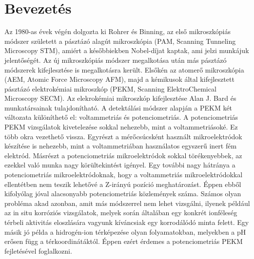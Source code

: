 \chapter{Bevezetés}
\pagestyle{headings}
Az 1980-as évek végén dolgozta ki Rohrer és Binning, az első mikroszkópiás módszer született a pásztázó alagút mikroszkópia (PAM, Scanning Tunneling Microscopy STM), amiért a későbbiekben Nobel-díjat kaptak, ami jelzi munkájuk jelentőségét. Az új mikroszkópiás módszer megalkotása után más pásztázó módszerek kifejlesztése is megalkotásra került. Elsőkén az atomerő  mikroszkópia (AEM, Atomic Force Microscopy AFM), majd a kémikusok által kifejlesztett pásztázó elektrokémiai mikroszkóp (PEKM, Scanning ElektroChemical Microscopy SECM). Az elekrokémiai mikroszkóp kifejlesztése Alan J. Bard és munkatársainak tulajdonítható. A detektálási módszer alapján a PEKM két változata különíthető el: voltammetriás és potenciometriás. A potenciometriás PEKM vizsgálatok kivetelezése sokkal nehezebb, mint a voltammetriásoké. Ez több okra vezethető vissza. Egyrészt a mérőcsúcsként használt mikroelektródok készítése is nehezebb, mint a  voltammetriában használatos egyszerű inert fém elektród. Másrészt a potenciometriás mikroelektródok sokkal törékenyebbek, az ezekkel való munka nagy körültekintést igényel. Egy további nagy hátránya a potenciometriás mikroelektródoknak, hogy a voltammetriás mikroelektródokkal ellentétben nem teszik lehetővé a Z-irányú pozíció meghatározást. Éppen ebből kifolyólag jóval alacsonyabb potenciometriás közlemények száma. Számos olyan probléma akad azonban, amit más módszerrel nem lehet vizsgálni, ilyenek például az in situ korróziós vizsgálatok, melyek során általában egy konkrét ionféleség térbeli aktivitás eloszlására vagyunk kíváncsiak egy korrodálódó minta felett. Egy másik jó példa a hidrogén-ion térképezése olyan folyamatokban, melyekben a pH erősen függ a térkoordinátáktól. Éppen ezért érdemes a potenciometriás PEKM fejletésével foglalkozni.
